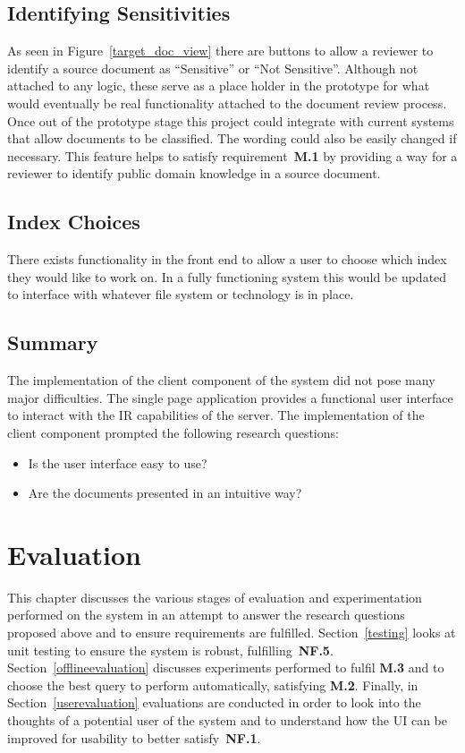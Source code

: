 \documentclass{l4proj}
\begin{document}
\section{Identifying Sensitivities}
As seen in Figure~\ref{target_doc_view} there are buttons to allow a reviewer to identify a source document as ``Sensitive'' or ``Not Sensitive''. Although not attached to any logic, these serve as a place holder in the prototype for what would eventually be real functionality attached to the document review process. Once out of the prototype stage this project could integrate with current systems that allow documents to be classified. The wording could also be easily changed if necessary. This feature helps to satisfy requirement~\textbf{M.1} by providing a way for a reviewer to identify public domain knowledge in a source document.
\section{Index Choices}
There exists functionality in the front end to allow a user to choose which index they would like to work on. In a fully functioning system this would be updated to interface with whatever file system or technology is in place.
\section{Summary} \label{clientsummary}
The implementation of the client component of the system did not pose many major difficulties. The single page application provides a functional user interface to interact with the IR capabilities of the server.
The implementation of the client component prompted the following research questions:
\begin{itemize}
\item Is the user interface easy to use?
\item Are the documents presented in an intuitive way?
\end{itemize}

\chapter{Evaluation} \label{evaluation}
This chapter discusses the various stages of evaluation and experimentation performed on the system in an attempt to answer the research questions proposed above and to ensure requirements are fulfilled.
Section~\ref{testing} looks at unit testing to ensure the system is robust, fulfilling~\textbf{NF.5}.
Section~\ref{offlineevaluation} discusses experiments performed to fulfil \textbf{M.3} and to choose the best query to perform automatically, satisfying \textbf{M.2}.
Finally, in Section~\ref{userevaluation} evaluations are conducted in order to look into the thoughts of a potential user of the system and to understand how the UI can be improved for usability to better satisfy~\textbf{NF.1}.
\end{document}
